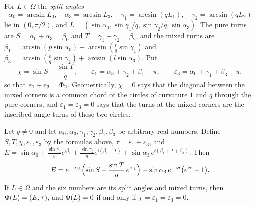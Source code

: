 For $L\in\Omega$ the \emph{split angles}
\[
  \alpha_0=\arcsin L_0,\quad \alpha_3=\arcsin L_3,\quad
  \gamma_1=\arcsin(qL_1),\quad \gamma_2=\arcsin(qL_2)
\]
lie in $(0,\pi/2)$, and $L=(\sin\alpha_0,\sin\gamma_1/q,\sin\gamma_2/q,\sin\alpha_3)$.
The pure turns are $S=\alpha_0+\alpha_3=\beta_0$ and $T=\gamma_1+\gamma_2=\beta_2$,
and the mixed turns are
$\beta_1=\arcsin(p\sin\alpha_0)+\arcsin(\frac tq\sin\gamma_1)$ and
$\beta_3=\arcsin(\frac hq\sin\gamma_2)+\arcsin(l\sin\alpha_3)$. Put
\[
  \chi=\sin S-\frac{\sin T}{q},\qquad
  \varepsilon_1=\alpha_3+\gamma_2+\beta_1-\pi,\qquad
  \varepsilon_3=\alpha_0+\gamma_1+\beta_3-\pi,
\]
so that $\varepsilon_1+\varepsilon_3=\Phi_2$. Geometrically, $\chi=0$ says
that the diagonal between the mixed corners is a common chord of the circles
of curvature $1$ and $q$ through the pure corners, and
$\varepsilon_1=\varepsilon_3=0$ says that the turns at the mixed corners are
the inscribed-angle turns of these two circles.

\begin{lemma}\label{lem:identity}
Let $q\ne0$ and let $\alpha_0,\alpha_3,\gamma_1,\gamma_2,\beta_1,\beta_3$ be
arbitrary real numbers. Define $S,T,\chi,\varepsilon_1,\varepsilon_3$ by the
formulas above, $\tau=\varepsilon_1+\varepsilon_3$, and
$E=\sin\alpha_0+\frac{\sin\gamma_1}qe^{\ii\beta_1}+\frac{\sin\gamma_2}qe^{\ii(\beta_1+T)}
+\sin\alpha_3\,e^{\ii(\beta_1+T+\beta_3)}$. Then
\begin{equation}\label{eq:identity}
  E=e^{-\mathrm{i}\alpha_3}\Bigl(\sin S-\frac{\sin T}{q}\,e^{\mathrm{i}\varepsilon_1}\Bigr)
  +\sin\alpha_3\,e^{-\mathrm{i} S}\bigl(e^{\mathrm{i}\tau}-1\bigr).
\end{equation}
If $L\in\Omega$ and the six numbers are its split angles and mixed turns, then
$\Phi(L)=(E,\tau)$, and $\Phi(L)=0$ if and only if
$\chi=\varepsilon_1=\varepsilon_3=0$.
\end{lemma}

